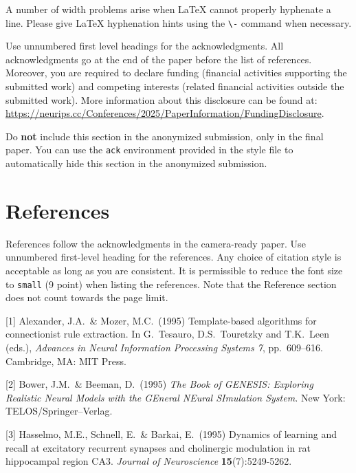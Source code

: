 \documentclass{article}
\begin{document}
A number of width problems arise when \LaTeX{} cannot properly hyphenate a
line. Please give LaTeX hyphenation hints using the \verb+\-+ command when
necessary.

\begin{ack}
    Use unnumbered first level headings for the acknowledgments. All acknowledgments
    go at the end of the paper before the list of references. Moreover, you are required to declare
    funding (financial activities supporting the submitted work) and competing interests (related financial activities outside the submitted work).
    More information about this disclosure can be found at: \url{https://neurips.cc/Conferences/2025/PaperInformation/FundingDisclosure}.


    Do {\bf not} include this section in the anonymized submission, only in the final paper. You can use the \texttt{ack} environment provided in the style file to automatically hide this section in the anonymized submission.
\end{ack}

\section*{References}


References follow the acknowledgments in the camera-ready paper. Use unnumbered first-level heading for
the references. Any choice of citation style is acceptable as long as you are
consistent. It is permissible to reduce the font size to \verb+small+ (9 point)
when listing the references.
Note that the Reference section does not count towards the page limit.
\medskip


{
\small


[1] Alexander, J.A.\ \& Mozer, M.C.\ (1995) Template-based algorithms for
connectionist rule extraction. In G.\ Tesauro, D.S.\ Touretzky and T.K.\ Leen
(eds.), {\it Advances in Neural Information Processing Systems 7},
pp.\ 609--616. Cambridge, MA: MIT Press.


    [2] Bower, J.M.\ \& Beeman, D.\ (1995) {\it The Book of GENESIS: Exploring
        Realistic Neural Models with the GEneral NEural SImulation System.}  New York:
TELOS/Springer--Verlag.


[3] Hasselmo, M.E., Schnell, E.\ \& Barkai, E.\ (1995) Dynamics of learning and
recall at excitatory recurrent synapses and cholinergic modulation in rat
hippocampal region CA3. {\it Journal of Neuroscience} {\bf 15}(7):5249-5262.
}


\end{document}
